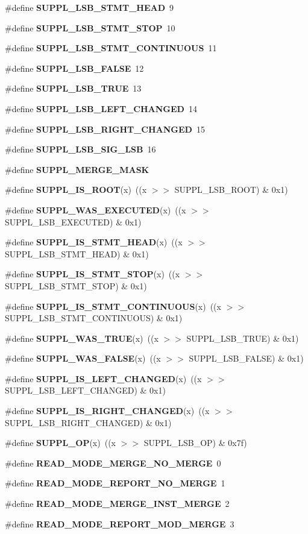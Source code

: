 \begin{CompactItemize}
\#define {\bf SUPPL\_\-LSB\_\-STMT\_\-HEAD}\ 9
\item 
\#define {\bf SUPPL\_\-LSB\_\-STMT\_\-STOP}\ 10
\item 
\#define {\bf SUPPL\_\-LSB\_\-STMT\_\-CONTINUOUS}\ 11
\item 
\#define {\bf SUPPL\_\-LSB\_\-FALSE}\ 12
\item 
\#define {\bf SUPPL\_\-LSB\_\-TRUE}\ 13
\item 
\#define {\bf SUPPL\_\-LSB\_\-LEFT\_\-CHANGED}\ 14
\item 
\#define {\bf SUPPL\_\-LSB\_\-RIGHT\_\-CHANGED}\ 15
\item 
\#define {\bf SUPPL\_\-LSB\_\-SIG\_\-LSB}\ 16
\item 
\#define {\bf SUPPL\_\-MERGE\_\-MASK}
\item 
\#define {\bf SUPPL\_\-IS\_\-ROOT}(x)\ ((x $>$$>$ SUPPL\_\-LSB\_\-ROOT) \& 0x1)
\item 
\#define {\bf SUPPL\_\-WAS\_\-EXECUTED}(x)\ ((x $>$$>$ SUPPL\_\-LSB\_\-EXECUTED) \& 0x1)
\item 
\#define {\bf SUPPL\_\-IS\_\-STMT\_\-HEAD}(x)\ ((x $>$$>$ SUPPL\_\-LSB\_\-STMT\_\-HEAD) \& 0x1)
\item 
\#define {\bf SUPPL\_\-IS\_\-STMT\_\-STOP}(x)\ ((x $>$$>$ SUPPL\_\-LSB\_\-STMT\_\-STOP) \& 0x1)
\item 
\#define {\bf SUPPL\_\-IS\_\-STMT\_\-CONTINUOUS}(x)\ ((x $>$$>$ SUPPL\_\-LSB\_\-STMT\_\-CONTINUOUS) \& 0x1)
\item 
\#define {\bf SUPPL\_\-WAS\_\-TRUE}(x)\ ((x $>$$>$ SUPPL\_\-LSB\_\-TRUE) \& 0x1)
\item 
\#define {\bf SUPPL\_\-WAS\_\-FALSE}(x)\ ((x $>$$>$ SUPPL\_\-LSB\_\-FALSE) \& 0x1)
\item 
\#define {\bf SUPPL\_\-IS\_\-LEFT\_\-CHANGED}(x)\ ((x $>$$>$ SUPPL\_\-LSB\_\-LEFT\_\-CHANGED) \& 0x1)
\item 
\#define {\bf SUPPL\_\-IS\_\-RIGHT\_\-CHANGED}(x)\ ((x $>$$>$ SUPPL\_\-LSB\_\-RIGHT\_\-CHANGED) \& 0x1)
\item 
\#define {\bf SUPPL\_\-OP}(x)\ ((x $>$$>$ SUPPL\_\-LSB\_\-OP) \& 0x7f)
\item 
\#define {\bf READ\_\-MODE\_\-MERGE\_\-NO\_\-MERGE}\ 0
\item 
\#define {\bf READ\_\-MODE\_\-REPORT\_\-NO\_\-MERGE}\ 1
\item 
\#define {\bf READ\_\-MODE\_\-MERGE\_\-INST\_\-MERGE}\ 2
\item 
\#define {\bf READ\_\-MODE\_\-REPORT\_\-MOD\_\-MERGE}\ 3
\item 

\end{CompactItemize}
